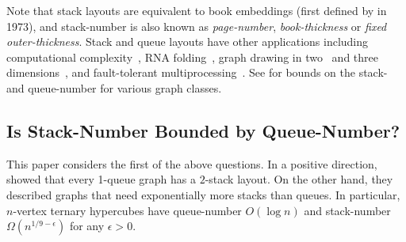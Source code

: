 \documentclass[kpfonts]{patmorin}
\begin{document}
Note that stack layouts are equivalent to book embeddings (first defined by \citet{Ollmann73} in 1973), and stack-number is also known as \emph{page-number}, \emph{book-thickness} or \emph{fixed outer-thickness}. Stack and queue layouts have other applications including computational complexity~\citep{GKS89,DSW16,Bourgain09,BY13},  RNA folding~\citep{HS99}, graph drawing in two~\citep{BB04,ADFPR12,SSSV-JGT96} and three dimensions~\citep{DMW05,Wood-GD01,DMW17,DPW04},
and fault-tolerant multiprocessing~\citep{CLR87,Rosenberg83a,Rosenberg86a,Rosenberg86}.
See \citep{BK79,Blankenship-PhD03,DujWoo04,DujWoo-DCG07,DJMMUW20,DFP13,BFGMMRU19,Yannakakis89,Yann20,MBKPRU20} for bounds on the stack- and queue-number for various graph classes.

\subsection*{Is Stack-Number Bounded by Queue-Number?}

This paper considers the first of the above questions. In a positive direction, \citet{HLR92}  showed that every 1-queue graph has a $2$-stack layout. On the other hand, they described graphs that need exponentially more stacks than queues. In particular, $n$-vertex ternary hypercubes have queue-number $O(\log n)$ and stack-number $\Omega(n^{1/9-\epsilon})$ for any $\epsilon>0$.


\end{document}

